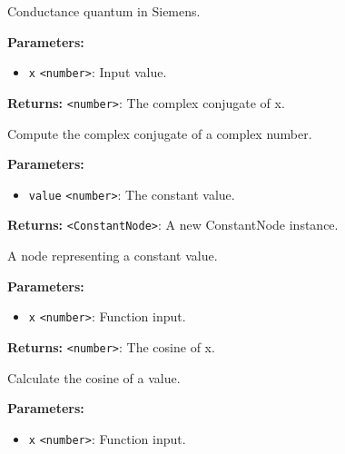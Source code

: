 \documentclass[12pt,a4paper]{article}
\begin{document}
\noindent Conductance quantum in Siemens.

\vspace{5mm}
\noindent {}


\noindent \textbf{Parameters:}
\begin{itemize}
  \item \texttt{x} \texttt{<number>}: Input value.
\end{itemize}

\noindent \textbf{Returns:} \texttt{<number>}: The complex conjugate of x.

\noindent Compute the complex conjugate of a complex number.

\vspace{5mm}
\noindent {}


\noindent \textbf{Parameters:}
\begin{itemize}
  \item \texttt{value} \texttt{<number>}: The constant value.
\end{itemize}

\noindent \textbf{Returns:} \texttt{<ConstantNode>}: A new ConstantNode instance.

\noindent A node representing a constant value.

\vspace{5mm}
\noindent {}


\noindent \textbf{Parameters:}
\begin{itemize}
  \item \texttt{x} \texttt{<number>}: Function input.
\end{itemize}

\noindent \textbf{Returns:} \texttt{<number>}: The cosine of x.

\noindent Calculate the cosine of a value.

\vspace{5mm}
\noindent {}


\noindent \textbf{Parameters:}
\begin{itemize}
  \item \texttt{x} \texttt{<number>}: Function input.
\end{itemize}
\end{document}
